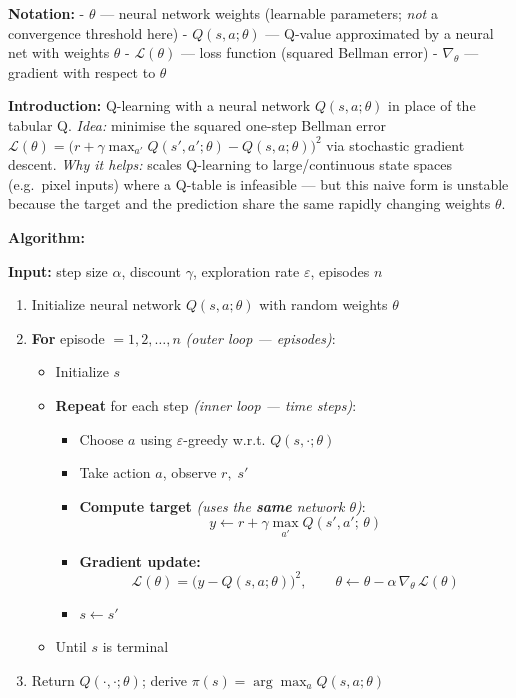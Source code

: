 \documentclass[11pt]{article}
\providecommand{\tightlist}{%
      \setlength{\itemsep}{0pt}\setlength{\parskip}{0pt}}
\begin{document}
    \textbf{Notation:} - \(\theta\) --- neural network weights (learnable
parameters; \emph{not} a convergence threshold here) - \(Q(s,a;\theta)\)
--- Q-value approximated by a neural net with weights \(\theta\) -
\(\mathcal{L}(\theta)\) --- loss function (squared Bellman error) -
\(\nabla_\theta\) --- gradient with respect to \(\theta\)

    \label{intro-3-1}

    \textbf{Introduction:} Q-learning with a neural network
\(Q(s,a;\theta)\) in place of the tabular Q. \emph{Idea:} minimise the
squared one-step Bellman error
\(\mathcal{L}(\theta) = \bigl(r + \gamma \max_{a'} Q(s', a';\theta) - Q(s, a;\theta)\bigr)^2\)
via stochastic gradient descent. \emph{Why it helps:} scales Q-learning
to large/continuous state spaces (e.g.~pixel inputs) where a Q-table is
infeasible --- but this naive form is unstable because the target and
the prediction share the same rapidly changing weights \(\theta\).

    \textbf{Algorithm:}

\textbf{Input:} step size \(\alpha\), discount \(\gamma\), exploration
rate \(\varepsilon\), episodes \(n\)

\begin{enumerate}
\def\labelenumi{\arabic{enumi}.}
\item
  Initialize neural network \(Q(s,a;\theta)\) with random weights
  \(\theta\)
\item
  \textbf{For} episode \(= 1, 2, \ldots, n\) \emph{(outer loop ---
  episodes)}:

  \begin{itemize}
  \tightlist
  \item
    Initialize \(s\)
  \item
    \textbf{Repeat} for each step \emph{(inner loop --- time steps)}:

    \begin{itemize}
    \tightlist
    \item
      Choose \(a\) using \(\varepsilon\)-greedy w.r.t.
      \(Q(s,\cdot;\theta)\)
    \item
      Take action \(a\), observe \(r,\; s'\)
    \item
      \textbf{Compute target} \emph{(uses the \textbf{same} network
      \(\theta\))}:
      \[y \leftarrow r + \gamma \max_{a'} Q(s', a';\, \theta)\]
    \item
      \textbf{Gradient update:}
      \[\mathcal{L}(\theta) = \bigl(y - Q(s,a;\theta)\bigr)^2, \qquad \theta \leftarrow \theta - \alpha\,\nabla_\theta\,\mathcal{L}(\theta)\]
    \item
      \(s \leftarrow s'\)
    \end{itemize}
  \item
    Until \(s\) is terminal
  \end{itemize}
\item
  Return \(Q(\cdot,\cdot;\theta)\); derive
  \(\pi(s) = \arg\max_a Q(s,a;\theta)\)
\end{enumerate}
\end{document}
